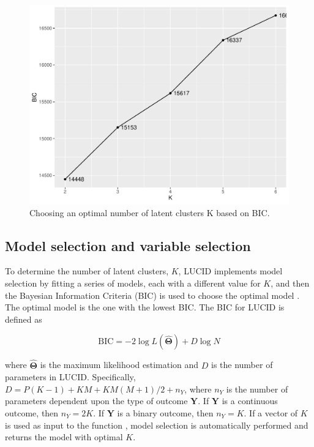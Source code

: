 
\begin{figure}[]
    \centering
    \includegraphics[scale = 0.6]{figures/fig4.pdf}
    \caption{Choosing an optimal number of latent clusters K based on BIC.}
    \label{fig4}
\end{figure}

\subsection{Model selection and variable selection} \label{sec3.3}

To determine the number of latent clusters, $K$, LUCID implements model selection by fitting a series of models, each with a different value for $K$, and then the Bayesian Information Criteria (BIC) is used to choose the optimal model \citep{fan2013tuning}. The optimal model is the one with the lowest BIC. The BIC for LUCID is defined as

\begin{equation}
    \text{BIC} = -2 \log L(\hat{\bm \Theta}) + D \log N
\end{equation}

where $\hat{\bm \Theta}$ is the maximum likelihood estimation and $D$ is the number of parameters in LUCID. Specifically, $D = P(K - 1) + KM + KM(M + 1)/2 + n_Y$, where $n_Y$ is the number of parameters dependent upon the type of outcome $\bm Y$. If $\bm Y$ is a continuous outcome, then $n_Y = 2K$. If $\bm Y$ is a binary outcome, then $n_Y = K$. If a vector of $K$ is used as input to the function , model selection is automatically performed and returns the model with optimal $K$.

